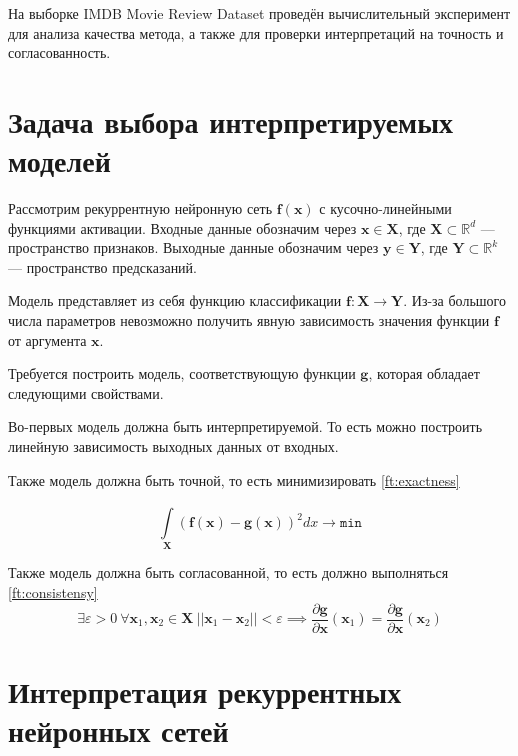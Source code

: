 \documentclass[a4paper, 12pt]{article}
\begin{document}
На выборке IMDB Movie Review Dataset \cite{maas-EtAl:2011:ACL-HLT2011} проведён вычислительный эксперимент для анализа качества метода, а также для проверки интерпретаций на точность и согласованность. 

\section{Задача выбора интерпретируемых моделей}
Рассмотрим рекуррентную нейронную сеть $\mathbf{f}(\mathbf{x})$ с кусочно-линейными функциями активации. Входные данные обозначим через $\mathbf{x} \in \mathbf{X}$, где $\mathbf{X} \subset \mathbb{R}^d$ --- пространство признаков. Выходные данные обозначим через $\mathbf{y} \in \mathbf{Y}$, где $\mathbf{Y} \subset \mathbb{R}^k$ --- пространство предсказаний.

Модель представляет из себя функцию классификации $\mathbf{f}: \mathbf{X} \to \mathbf{Y}$. Из-за большого числа параметров невозможно получить явную зависимость значения функции $\mathbf{f}$ от аргумента $\mathbf{x}$.

Требуется построить модель, соответствующую функции $\mathbf{g}$, которая обладает следующими свойствами.

Во-первых модель должна быть интерпретируемой. То есть можно построить линейную зависимость выходных данных от входных.

Также модель должна быть точной, то есть минимизировать \eqref{ft:exactness}

\begin{equation}\label{ft:exactness}
\int\limits_{\mathbf{X}}^{}{\left(\mathbf{f}(\mathbf{x}) - \mathbf{g}(\mathbf{x})\right)^2dx} \to \texttt{min}
\end{equation}

Также модель должна быть согласованной, то есть должно выполняться \eqref{ft:consistensy}
\begin{equation}\label{ft:consistensy}
\exists \varepsilon > 0\: \forall \mathbf{x}_1, \mathbf{x}_2 \in \mathbf{X}\: ||\mathbf{x}_1-\mathbf{x}_2||<\varepsilon \implies \frac{\partial{\mathbf{g}}}{\partial{\mathbf{x}}}(\mathbf{x}_1)=\frac{\partial{\mathbf{g}}}{\partial{\mathbf{x}}}(\mathbf{x}_2)
\end{equation}

\section{Интерпретация рекуррентных нейронных сетей}
\end{document}
